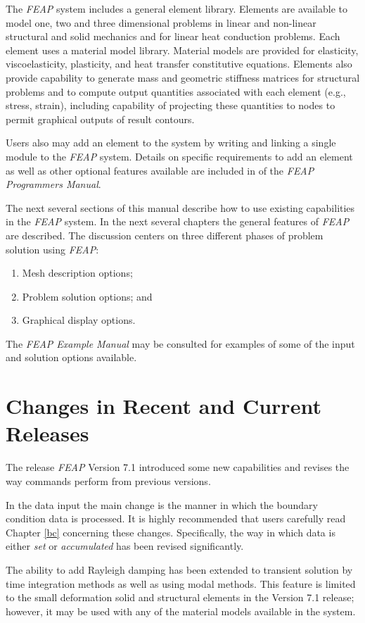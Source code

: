 The {\sl FEAP} system includes a general element library.
Elements are available to model one, two and three dimensional problems
in linear and non-linear
structural and solid mechanics and for linear heat conduction problems.
Each element uses a material
model library. Material models are provided for elasticity,
viscoelasticity, plasticity, and heat transfer constitutive equations.
Elements also provide capability to generate mass and
geometric stiffness matrices for structural problems and to compute output
quantities associated with each element (e.g., stress, strain), including
capability of projecting these quantities to nodes to permit graphical
outputs of result contours.

Users also may add an element to the system by writing and linking a single
module to the {\sl FEAP} system. Details on
specific requirements to add an element as well as other optional
features available are included in of the {\sl FEAP Programmers
Manual}.

The next several sections of this manual describe how to use existing
capabilities in the {\sl FEAP} system.  In the next several chapters
the general features of {\sl FEAP} are described.  The discussion
centers on three different phases of problem solution using {\sl FEAP}:
\begin{enumerate}
\item Mesh description options;
\item Problem solution options; and
\item Graphical display options.
\end{enumerate}
The {\sl FEAP Example Manual}
may be consulted for examples of some of the input and solution
options available.

\section{Changes in Recent and Current Releases}

The release \textsl{FEAP} Version 7.1 introduced some new capabilities
and revises the way commands perform from previous versions.

In the data input the main
change is the manner in which the boundary condition data is processed.
It is highly recommended that users carefully read Chapter \ref{bc} concerning
these changes.  Specifically, the way in which data is either {\it set} or
{\it accumulated} has been revised significantly.

The ability to add Rayleigh damping has been extended to transient solution
by time integration methods as well as using modal methods.  This feature
is limited to the small deformation solid and structural elements in the
Version 7.1 release; however, it may be used with any of the material models
available in the system.

